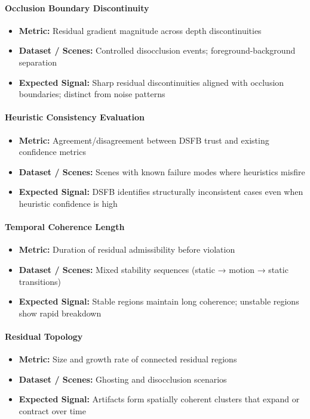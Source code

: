 \documentclass[11pt,letterpaper]{article}
\theoremstyle{gcresult}
\theoremstyle{definition}
\begin{document}
\paragraph{Occlusion Boundary Discontinuity}
\begin{itemize}
    \item \textbf{Metric:} Residual gradient magnitude across depth discontinuities
    \item \textbf{Dataset / Scenes:} Controlled disocclusion events; foreground-background separation
    \item \textbf{Expected Signal:} Sharp residual discontinuities aligned with occlusion boundaries; distinct from noise patterns
\end{itemize}

\paragraph{Heuristic Consistency Evaluation}
\begin{itemize}
    \item \textbf{Metric:} Agreement/disagreement between DSFB trust and existing confidence metrics
    \item \textbf{Dataset / Scenes:} Scenes with known failure modes where heuristics misfire
    \item \textbf{Expected Signal:} DSFB identifies structurally inconsistent cases even when heuristic confidence is high
\end{itemize}

\paragraph{Temporal Coherence Length}
\begin{itemize}
    \item \textbf{Metric:} Duration of residual admissibility before violation
    \item \textbf{Dataset / Scenes:} Mixed stability sequences (static → motion → static transitions)
    \item \textbf{Expected Signal:} Stable regions maintain long coherence; unstable regions show rapid breakdown
\end{itemize}

\paragraph{Residual Topology}
\begin{itemize}
    \item \textbf{Metric:} Size and growth rate of connected residual regions
    \item \textbf{Dataset / Scenes:} Ghosting and disocclusion scenarios
    \item \textbf{Expected Signal:} Artifacts form spatially coherent clusters that expand or contract over time
\end{itemize}
\end{document}
